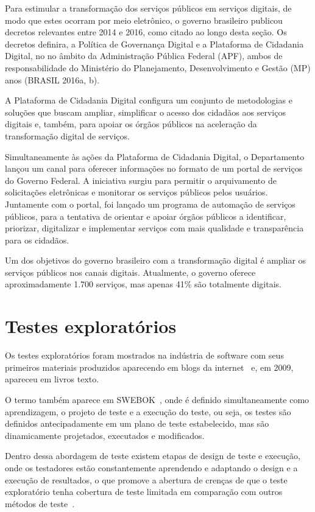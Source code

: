 Para estimular a transformação dos serviços públicos em serviços digitais, de modo que estes ocorram por meio eletrônico, o governo
brasileiro publicou decretos relevantes entre 2014 e 2016, como citado ao longo desta seção. Os decretos definira, a Política de Governança
Digital e a Plataforma de Cidadania Digital, no no âmbito da Administração Pública Federal (APF), ambos de responsabilidade do 
Ministério do Planejamento, Desenvolvimento e Gestão (MP) anos (BRASIL 2016a, b). 

A Plataforma de Cidadania Digital configura um conjunto de metodologias e soluções que buscam ampliar, simplificar o acesso dos
cidadãos aos serviços digitais e, também, para apoiar os órgãos públicos na aceleração da transformação digital de serviços. 

Simultaneamente às ações da Plataforma de Cidadania Digital, o Departamento lançou um canal para oferecer informações no
formato de um  portal de serviços do Governo Federal. A iniciativa surgiu para permitir o arquivamento de solicitações eletrônicas 
e monitorar os serviços públicos pelos usuários. Juntamente com o portal, foi lançado um programa de automação de serviços 
públicos, para a tentativa de orientar e apoiar órgãos públicos a identificar, priorizar, digitalizar e implementar serviços 
com mais qualidade e transparência para os cidadãos.

Um dos objetivos do governo brasileiro com a transformação digital é ampliar os serviços públicos nos canais digitais. 
Atualmente, o governo oferece aproximadamente 1.700 serviços, mas apenas 41\% são totalmente digitais.


\section{Testes exploratórios}

Os testes exploratórios foram mostrados na indústria de software com seus primeiros materiais produzidos 
aparecendo em blogs da internet~\cite{kaner2000testing} e, em 2009, apareceu em livros texto. 

O termo também aparece em SWEBOK~\cite{bourque2014guide}, onde é definido simultaneamente como aprendizagem, o projeto de teste 
e a execução do teste, ou seja, os testes são definidos antecipadamente em um plano de teste estabelecido, mas 
são dinamicamente projetados, executados e modificados.

Dentro dessa abordagem de teste existem etapas de design de teste e execução, onde os testadores estão constantemente aprendendo e 
adaptando o design e a execução de resultados, o que promove a abertura de crenças de que o teste exploratório tenha cobertura de 
teste limitada em comparação com outros métodos de teste~\cite{schaefer2014model}.

